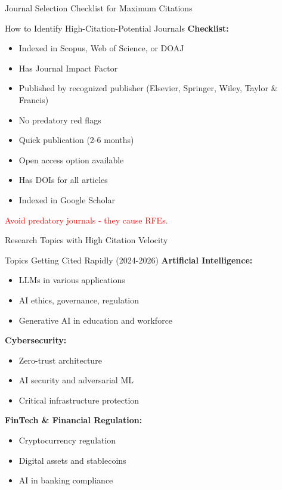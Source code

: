 \documentclass[11pt]{beamer}
\begin{document}
	
	\begin{frame}{Journal Selection Checklist for Maximum Citations}
		\small
		\begin{block}{How to Identify High-Citation-Potential Journals}
			\textbf{Checklist:}
			\begin{itemize}
				\item [$\checkmark$] Indexed in Scopus, Web of Science, or DOAJ
				\item [$\checkmark$] Has Journal Impact Factor
				\item [$\checkmark$] Published by recognized publisher (Elsevier, Springer, Wiley, Taylor \& Francis)
				\item [$\checkmark$] No predatory red flags
				\item [$\checkmark$] Quick publication (2-6 months)
				\item [$\checkmark$] Open access option available
				\item [$\checkmark$] Has DOIs for all articles
				\item [$\checkmark$] Indexed in Google Scholar
			\end{itemize}
			\textcolor{red}{Avoid predatory journals - they cause RFEs.}
		\end{block}
	\end{frame}
	
	\begin{frame}{Research Topics with High Citation Velocity}
		\small
		\begin{block}{Topics Getting Cited Rapidly (2024-2026)}
			\textbf{Artificial Intelligence:}
			\begin{itemize}
				\item LLMs in various applications
				\item AI ethics, governance, regulation
				\item Generative AI in education and workforce
			\end{itemize}
			\textbf{Cybersecurity:}
			\begin{itemize}
				\item Zero-trust architecture
				\item AI security and adversarial ML
				\item Critical infrastructure protection
			\end{itemize}
			\textbf{FinTech \& Financial Regulation:}
			\begin{itemize}
				\item Cryptocurrency regulation
				\item Digital assets and stablecoins
				\item AI in banking compliance
			\end{itemize}
		\end{block}
	\end{frame}
	
\end{document}
